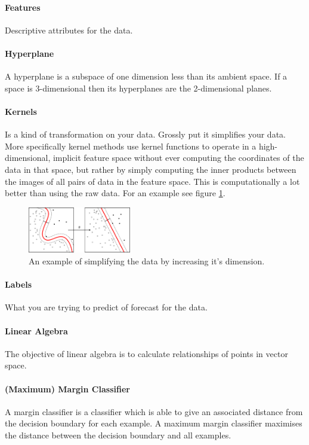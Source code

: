 \paragraph{Features} 
Descriptive attributes for the data.

\paragraph{Hyperplane}
A hyperplane is a subspace of one dimension less than its ambient space. If a space is 3-dimensional then its hyperplanes are the 2-dimensional planes.

\paragraph{Kernels} 
Is a kind of transformation on your data. Grossly put it simplifies your data. More specifically kernel methods use kernel functions to operate in a high-dimensional, implicit feature space without ever computing the coordinates of the data in that space, but rather by simply computing the inner products between the images of all pairs of data in the feature space. This is computationally a lot better than using the raw data. For an example see figure \ref{fig:kernelmethods}.
\begin{figure}
\centering
\includegraphics[width=0.4\textwidth]{images/kernelmethod.png}
\caption{\label{fig:kernelmethods} An example of simplifying the data by increasing it's dimension.}
\end{figure}

\paragraph{Labels} 
What you are trying to predict of forecast for the data.

\paragraph{Linear Algebra} 
The objective of linear algebra is to calculate relationships of points in vector space. 

\paragraph{(Maximum) Margin Classifier}
A margin classifier is a classifier which is able to give an associated distance from the decision boundary for each example. A maximum margin classifier maximises the distance between the decision boundary and all examples.

